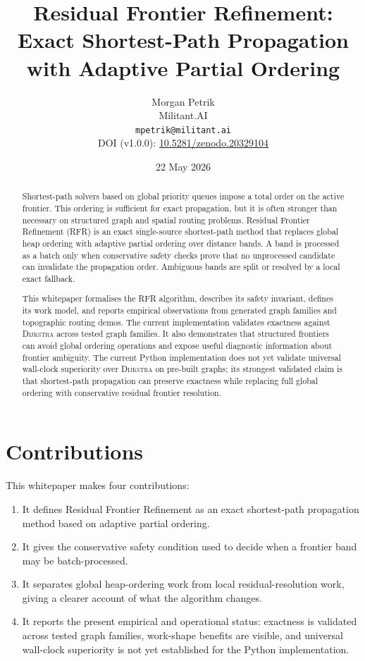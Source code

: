 \documentclass[11pt]{article}
\title{Residual Frontier Refinement: Exact Shortest-Path Propagation with Adaptive Partial Ordering}
\author{
  Morgan Petrik\\
  Militant.AI\\
  \texttt{mpetrik@militant.ai}\\[0.75em]
  DOI (v1.0.0): \href{https://doi.org/10.5281/zenodo.20329104}{10.5281/zenodo.20329104}
}
\date{22 May 2026}
\newcommand{\RFR}{\textsc{RFR}}
\newcommand{\Dijkstra}{\textsc{Dijkstra}}
\begin{document}
\maketitle

\begin{abstract}
Shortest-path solvers based on global priority queues impose a total order on the active frontier. This ordering is sufficient for exact propagation, but it is often stronger than necessary on structured graph and spatial routing problems. Residual Frontier Refinement (\RFR{}) is an exact single-source shortest-path method that replaces global heap ordering with adaptive partial ordering over distance bands. A band is processed as a batch only when conservative safety checks prove that no unprocessed candidate can invalidate the propagation order. Ambiguous bands are split or resolved by a local exact fallback.

This whitepaper formalises the \RFR{} algorithm, describes its safety invariant, defines its work model, and reports empirical observations from generated graph families and topographic routing demos. The current implementation validates exactness against \Dijkstra{} across tested graph families. It also demonstrates that structured frontiers can avoid global ordering operations and expose useful diagnostic information about frontier ambiguity. The current Python implementation does not yet validate universal wall-clock superiority over \Dijkstra{} on pre-built graphs; its strongest validated claim is that shortest-path propagation can preserve exactness while replacing full global ordering with conservative residual frontier resolution.
\end{abstract}

\section{Contributions}

This whitepaper makes four contributions:

\begin{enumerate}
  \item It defines Residual Frontier Refinement as an exact shortest-path propagation method based on adaptive partial ordering.
  \item It gives the conservative safety condition used to decide when a frontier band may be batch-processed.
  \item It separates global heap-ordering work from local residual-resolution work, giving a clearer account of what the algorithm changes.
  \item It reports the present empirical and operational status: exactness is validated across tested graph families, work-shape benefits are visible, and universal wall-clock superiority is not yet established for the Python implementation.
\end{enumerate}
\end{document}
